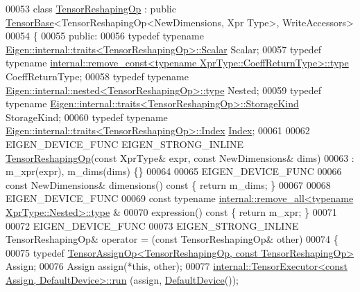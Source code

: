 \begin{DoxyCode}
00053 \textcolor{keyword}{class }\hyperlink{class_eigen_1_1_tensor_reshaping_op}{TensorReshapingOp} : \textcolor{keyword}{public} \hyperlink{class_eigen_1_1_tensor_base}{TensorBase}<TensorReshapingOp<NewDimensions, Xpr
      Type>, WriteAccessors>
00054 \{
00055   \textcolor{keyword}{public}:
00056   \textcolor{keyword}{typedef} \textcolor{keyword}{typename} \hyperlink{struct_eigen_1_1internal_1_1traits}{Eigen::internal::traits<TensorReshapingOp>::Scalar}
       Scalar;
00057   \textcolor{keyword}{typedef} \textcolor{keyword}{typename} 
      \hyperlink{group___sparse_core___module}{internal::remove\_const<typename XprType::CoeffReturnType>::type}
       CoeffReturnType;
00058   \textcolor{keyword}{typedef} \textcolor{keyword}{typename} \hyperlink{class_eigen_1_1internal_1_1_tensor_lazy_evaluator_writable}{Eigen::internal::nested<TensorReshapingOp>::type}
       Nested;
00059   \textcolor{keyword}{typedef} \textcolor{keyword}{typename} \hyperlink{struct_eigen_1_1internal_1_1traits}{Eigen::internal::traits<TensorReshapingOp>::StorageKind}
       StorageKind;
00060   \textcolor{keyword}{typedef} \textcolor{keyword}{typename} \hyperlink{struct_eigen_1_1internal_1_1traits}{Eigen::internal::traits<TensorReshapingOp>::Index}
       \hyperlink{namespace_eigen_a62e77e0933482dafde8fe197d9a2cfde}{Index};
00061 
00062   EIGEN\_DEVICE\_FUNC EIGEN\_STRONG\_INLINE \hyperlink{class_eigen_1_1_tensor_reshaping_op}{TensorReshapingOp}(\textcolor{keyword}{const} XprType& expr, \textcolor{keyword}{const} 
      NewDimensions& dims)
00063       : m\_xpr(expr), m\_dims(dims) \{\}
00064 
00065     EIGEN\_DEVICE\_FUNC
00066     \textcolor{keyword}{const} NewDimensions& dimensions()\textcolor{keyword}{ const }\{ \textcolor{keywordflow}{return} m\_dims; \}
00067 
00068     EIGEN\_DEVICE\_FUNC
00069     \textcolor{keyword}{const} \textcolor{keyword}{typename} \hyperlink{group___sparse_core___module}{internal::remove\_all<typename XprType::Nested>::type}
      &
00070     expression()\textcolor{keyword}{ const }\{ \textcolor{keywordflow}{return} m\_xpr; \}
00071 
00072     EIGEN\_DEVICE\_FUNC
00073     EIGEN\_STRONG\_INLINE TensorReshapingOp& operator = (\textcolor{keyword}{const} TensorReshapingOp& other)
00074     \{
00075       \textcolor{keyword}{typedef} \hyperlink{class_eigen_1_1_tensor_assign_op}{TensorAssignOp<TensorReshapingOp, const TensorReshapingOp>}
       Assign;
00076       Assign assign(*\textcolor{keyword}{this}, other);
00077       \hyperlink{class_eigen_1_1internal_1_1_tensor_executor}{internal::TensorExecutor<const Assign, DefaultDevice>::run}
      (assign, \hyperlink{struct_eigen_1_1_default_device}{DefaultDevice}());

\end{DoxyCode}
